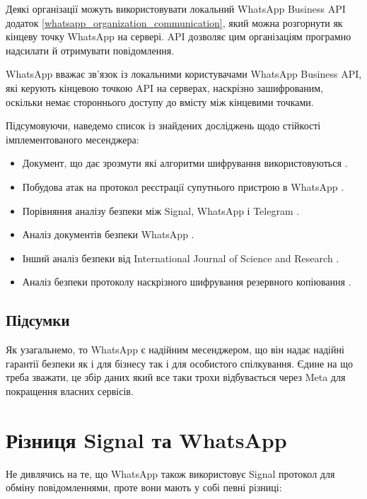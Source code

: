 Деякі організації можуть використовувати локальний WhatsApp Business API додаток \ref{whatsapp_organization_communication}, який можна розгорнути як кінцеву точку WhatsApp на сервері. API дозволяє цим організаціям програмно надсилати й отримувати повідомлення.

WhatsApp вважає зв’язок із локальними користувачами WhatsApp Business API, які керують кінцевою точкою API на серверах, наскрізно зашифрованим, оскільки немає стороннього доступу до вмісту між кінцевими точками.

Підсумовуючи, наведемо список із знайдених досліджень щодо стійкості імплементованого месенджера:
\begin{itemize}
    \item Документ, що дає зрозмути які алгоритми шифрування використовуються \cite{whatsapp2024encryption}.
    \item Побудова атак на протокол реєстрацiї супутнього пристрою в WhatsApp \cite{nemkovich2023whatsapp}.
    \item Порівняння аналізу безпеки між Signal, WhatsApp і Telegram \cite{bogos2023security}.
    \item Аналіз документів безпеки WhatsApp \cite{li2016whatsapp}.
    \item Інший аналіз безпеки від International Journal of Science and Research \cite{alhameed2018whatsapp}.
    \item Аналіз безпеки протоколу наскрізного шифрування резервного копіювання \cite{davies2023security}.
\end{itemize}


\subsection{Підсумки}

Як узагальнемо, то WhatsApp є надійним месенджером, що він надає надійні гарантії безпеки як і для бізнесу так і для особистого спілкування. Єдине на що треба зважати, це збір даних який все таки трохи відбувається через Meta для покращення власних сервісів.


\section{Різниця Signal та WhatsApp}

Не дивлячись на те, що WhatsApp також використовує Signal протокол для обміну повідомленнями, проте вони мають у собі певні різниці:

